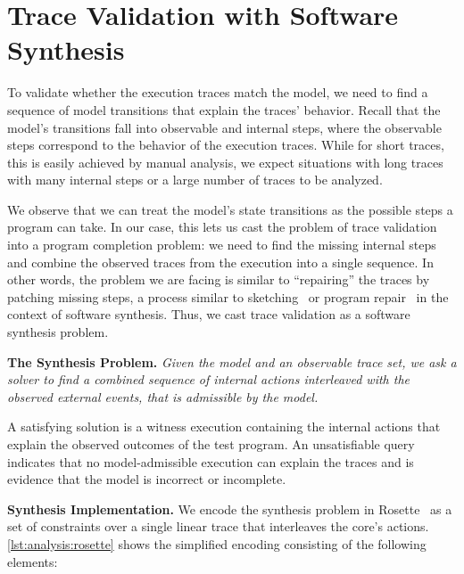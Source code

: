 \section{Trace Validation with Software Synthesis}\label{sec:analysis}

To validate whether the execution traces match the model, we need to find a sequence of model transitions that explain the traces' behavior. 
Recall that the model's transitions fall into observable and internal steps, where the observable steps correspond to the behavior of the execution traces. 
While for short traces, this is easily achieved by manual analysis, we expect situations with long traces with many internal steps or a large number of traces to be analyzed.

We observe that we can treat the model's state transitions as the possible steps a program can take.
In our case, this lets us cast the problem of trace validation into a program completion problem: we need to find the missing internal steps and combine the observed traces from the execution into a single sequence. In other words, the problem we are facing is similar to ``repairing'' the traces by patching missing steps, a process similar to sketching~\cite{Solar-Lezama:2006:Sketching} 
or program repair~\cite{Nguyen:2013:SemFix} in the context of software synthesis. Thus, we cast trace validation as a software synthesis problem.

\begin{tcolorbox}[
title filled=false,
boxsep=1pt, top=0pt, bottom=0pt, left=1pt, right=1pt,
before skip=3pt, after skip=3pt,
colback=black!5!white,
colframe=black!5!white
]
\noindent\textbf{The Synthesis Problem.}
\emph{Given the model and an observable trace set, we ask a solver to find a combined sequence of internal actions interleaved with the observed external events, that is admissible by the model.}
\end{tcolorbox}

A satisfying solution is a witness execution containing the internal actions that explain the observed outcomes of the test program. An unsatisfiable query indicates that no model-admissible execution can explain the traces and is evidence that the model is incorrect or incomplete. 

\noindent\textbf{Synthesis Implementation.}
We encode the synthesis problem in Rosette~\cite{Torlak:2013:Rosette} as a set of constraints over a single linear trace that interleaves the core's actions. 
\autoref{lst:analysis:rosette} shows the simplified encoding consisting of the following elements:

